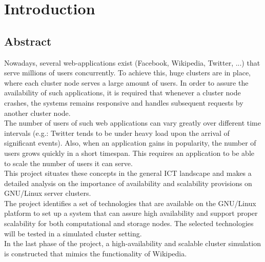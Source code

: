 \documentclass[12pt]{report}
\begin{document}
\chapter{Introduction} %
\section{Abstract}
Nowadays, several web-applications exist (Facebook, Wikipedia, Twitter, ...) that serve millions of users concurrently. To achieve this, huge clusters are in place, where each cluster node serves a large amount of users. In order to assure the availability of such applications, it is required that whenever a cluster node crashes, the systems remains responsive and handles subsequent requests by another cluster node.\\
The number of users of such web applications can vary greatly over different time intervals (e.g.: Twitter tends to be under heavy load upon the arrival of significant events). Also, when an application gains in popularity, the number of users grows quickly in a short timespan. This requires an application to be able to scale the number of users it can serve.\\
This project situates these concepts in the general ICT landscape and makes a detailed analysis on the importance of availability and scalability provisions on GNU/Linux server clusters.\\
The project identifies a set of technologies that are available on the GNU/Linux platform to set up a system that can assure high availability and support proper scalability for both computational and storage nodes. The selected technologies will be tested in a simulated cluster setting.\\
In the last phase of the project, a high-availability and scalable
cluster simulation is constructed that mimics the functionality of
Wikipedia.
\end{document}
